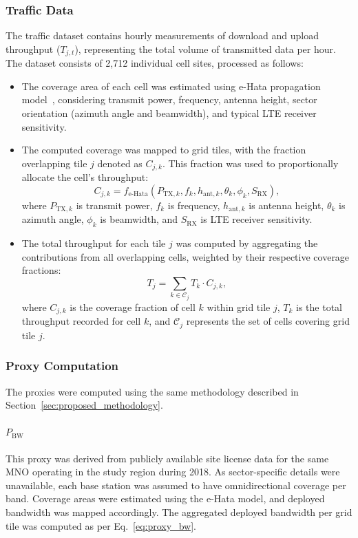 \documentclass[conference]{IEEEtran}
\begin{document}
\subsubsection{Traffic Data}
The traffic dataset contains hourly measurements of download and upload throughput (\(T_{j,t}\)), representing the total volume of transmitted data per hour. The dataset consists of 2,712 individual cell sites, processed as follows:
\begin{itemize}
    \item The coverage area of each cell was estimated using e-Hata propagation model~\cite{Okumura1968}, considering transmit power, frequency, antenna height, sector orientation (azimuth angle and beamwidth), and typical LTE receiver sensitivity.
    \item The computed coverage was mapped to grid tiles, with the fraction overlapping tile \(j\) denoted as \(C_{j,k}\). This fraction was used to proportionally allocate the cell's throughput:
    \begin{equation}
    C_{j,k} = f_{\text{e-Hata}}(P_{\text{TX},k}, f_k, h_{\text{ant},k}, \theta_k, \phi_k, S_{\text{RX}}),
    \end{equation}
    where \( P_{\text{TX},k} \) is transmit power, \( f_k \) is frequency, \( h_{\text{ant},k} \) is antenna height, \( \theta_k \) is azimuth angle, \( \phi_k \) is beamwidth, and \( S_{\text{RX}} \) is LTE receiver sensitivity.
    \item The total throughput for each tile \(j\) was computed by aggregating the contributions from all overlapping cells, weighted by their respective coverage fractions:
    \begin{equation}
    T_j = \sum_{k \in \mathcal{C}_j} T_k \cdot C_{j,k},
    \end{equation}
    where \( C_{j,k} \) is the coverage fraction of cell \( k \) within grid tile \( j \), \( T_k \) is the total throughput recorded for cell \( k \), and \( \mathcal{C}_j \) represents the set of cells covering grid tile \( j \).
\end{itemize}

\subsubsection{Proxy Computation}
The proxies were computed using the same methodology described in Section~\ref{sec:proposed_methodology}.

\paragraph{\(P_{\text{BW}}\)}
This proxy was derived from publicly available site license data for the same MNO operating in the study region during 2018. As sector-specific details were unavailable, each base station was assumed to have omnidirectional coverage per band. Coverage areas were estimated using the e-Hata model, and deployed bandwidth was mapped accordingly. The aggregated deployed bandwidth per grid tile was computed as per Eq.~\eqref{eq:proxy_bw}.
\end{document}
